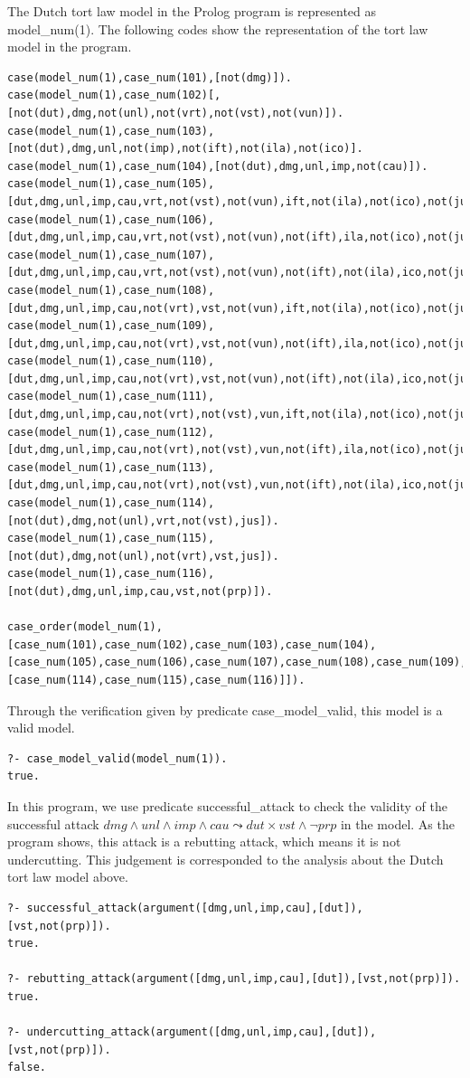 \documentclass{IOS-Book-Article}
\begin{document}
The Dutch tort law model in the Prolog program is represented as {\mf model\_num(1)}. The following codes show the representation of the tort law model in the program.
\begin{lstlisting}
case(model_num(1),case_num(101),[not(dmg)]).
case(model_num(1),case_num(102)[,[not(dut),dmg,not(unl),not(vrt),not(vst),not(vun)]).
case(model_num(1),case_num(103),[not(dut),dmg,unl,not(imp),not(ift),not(ila),not(ico)].
case(model_num(1),case_num(104),[not(dut),dmg,unl,imp,not(cau)]).
case(model_num(1),case_num(105),[dut,dmg,unl,imp,cau,vrt,not(vst),not(vun),ift,not(ila),not(ico),not(jus),prp]).
case(model_num(1),case_num(106),[dut,dmg,unl,imp,cau,vrt,not(vst),not(vun),not(ift),ila,not(ico),not(jus),prp]).
case(model_num(1),case_num(107),[dut,dmg,unl,imp,cau,vrt,not(vst),not(vun),not(ift),not(ila),ico,not(jus),prp]).
case(model_num(1),case_num(108),[dut,dmg,unl,imp,cau,not(vrt),vst,not(vun),ift,not(ila),not(ico),not(jus),prp]).
case(model_num(1),case_num(109),[dut,dmg,unl,imp,cau,not(vrt),vst,not(vun),not(ift),ila,not(ico),not(jus),prp]).
case(model_num(1),case_num(110),[dut,dmg,unl,imp,cau,not(vrt),vst,not(vun),not(ift),not(ila),ico,not(jus),prp]).
case(model_num(1),case_num(111),[dut,dmg,unl,imp,cau,not(vrt),not(vst),vun,ift,not(ila),not(ico),not(jus),prp]).
case(model_num(1),case_num(112),[dut,dmg,unl,imp,cau,not(vrt),not(vst),vun,not(ift),ila,not(ico),not(jus),prp]).
case(model_num(1),case_num(113),[dut,dmg,unl,imp,cau,not(vrt),not(vst),vun,not(ift),not(ila),ico,not(jus),prp]).
case(model_num(1),case_num(114),[not(dut),dmg,not(unl),vrt,not(vst),jus]).
case(model_num(1),case_num(115),[not(dut),dmg,not(unl),not(vrt),vst,jus]).
case(model_num(1),case_num(116),[not(dut),dmg,unl,imp,cau,vst,not(prp)]).

case_order(model_num(1),[case_num(101),case_num(102),case_num(103),case_num(104),[case_num(105),case_num(106),case_num(107),case_num(108),case_num(109),case_num(110),case_num(111),case_num(112),case_num(113)],[case_num(114),case_num(115),case_num(116)]]).
\end{lstlisting}

Through the verification given by predicate {\mf case\_model\_valid}, this model is a valid model.
\begin{lstlisting}
?- case_model_valid(model_num(1)).
true.
\end{lstlisting}

In this program, we use predicate {\mf successful\_attack} to check the validity of the successful attack $dmg \wedge unl \wedge imp \wedge cau \leadsto dut \times vst \wedge \neg prp$ in the model. As the program shows, this attack is a rebutting attack, which means it is not undercutting. This judgement is corresponded to the analysis about the Dutch tort law model above.
\begin{lstlisting}
?- successful_attack(argument([dmg,unl,imp,cau],[dut]),[vst,not(prp)]).
true.

?- rebutting_attack(argument([dmg,unl,imp,cau],[dut]),[vst,not(prp)]).
true.

?- undercutting_attack(argument([dmg,unl,imp,cau],[dut]),[vst,not(prp)]).
false.
\end{lstlisting}
\end{document}
